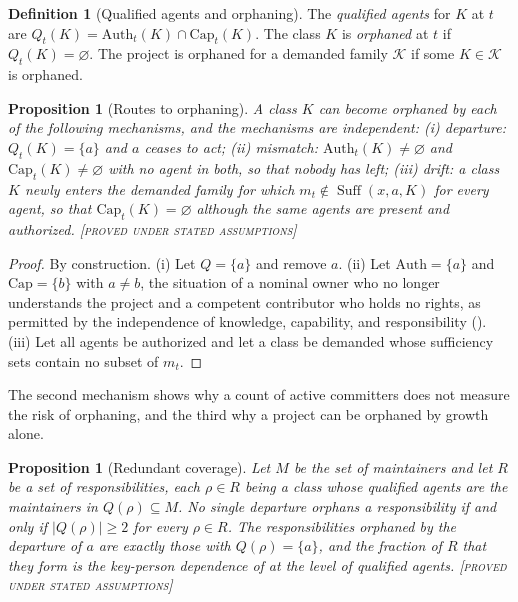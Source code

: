 \documentclass[11pt,twoside,openright]{book}
\theoremstyle{plain}
\newtheorem{proposition}[theorem]{Proposition}
\theoremstyle{definition}
\newtheorem{definition}[theorem]{Definition}
\theoremstyle{remark}
\newcommand{\Proved}{\textup{\textsc{[proved under stated assumptions]}}}
\newcommand{\Suff}{\operatorname{Suff}}
\begin{document}
\begin{definition}[Qualified agents and orphaning]\label{def:orphan}
The \emph{qualified agents} for $K$ at $t$ are $Q_t(K)=\mathrm{Auth}_t(K)\cap\mathrm{Cap}_t(K)$. The class $K$ is \emph{orphaned} at $t$ if $Q_t(K)=\varnothing$. The project is orphaned for a demanded family $\mathcal{K}$ if some $K\in\mathcal{K}$ is orphaned.
\end{definition}

\begin{proposition}[Routes to orphaning]\label{prop:orphanroutes}
A class $K$ can become orphaned by each of the following mechanisms, and the mechanisms are independent: (i) \emph{departure}: $Q_t(K)=\{a\}$ and $a$ ceases to act; (ii) \emph{mismatch}: $\mathrm{Auth}_t(K)\neq\varnothing$ and $\mathrm{Cap}_t(K)\neq\varnothing$ with no agent in both, so that nobody has left; (iii) \emph{drift}: a class $K$ newly enters the demanded family for which $m_t\notin\Suff(x,a,K)$ for every agent, so that $\mathrm{Cap}_t(K)=\varnothing$ although the same agents are present and authorized.
\Proved{}
\end{proposition}

\begin{proof}
By construction. (i) Let $Q=\{a\}$ and remove $a$. (ii) Let $\mathrm{Auth}=\{a\}$ and $\mathrm{Cap}=\{b\}$ with $a\ne b$, the situation of a nominal owner who no longer understands the project and a competent contributor who holds no rights, as permitted by the independence of knowledge, capability, and responsibility (). (iii) Let all agents be authorized and let a class be demanded whose sufficiency sets contain no subset of $m_t$.
\end{proof}

The second mechanism shows why a count of active committers does not measure the risk of orphaning, and the third why a project can be orphaned by growth alone.

\begin{proposition}[Redundant coverage]\label{prop:coverage}
Let $M$ be the set of maintainers and let $R$ be a set of responsibilities, each $\rho\in R$ being a class whose qualified agents are the maintainers in $Q(\rho)\subseteq M$. No single departure orphans a responsibility if and only if $|Q(\rho)|\ge2$ for every $\rho\in R$. The responsibilities orphaned by the departure of $a$ are exactly those with $Q(\rho)=\{a\}$, and the fraction of $R$ that they form is the key-person dependence of  at the level of qualified agents.
\Proved{}
\end{proposition}
\end{document}
